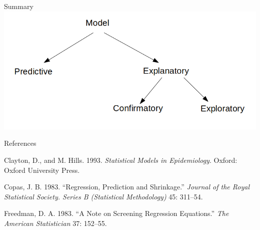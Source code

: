 \documentclass[
  10pt,
  ignorenonframetext,
]{beamer}
\newlength{\cslhangindent}
\newlength{\cslentryspacingunit} %
\newenvironment{CSLReferences}[2] %
 {%
  \setlength{\parindent}{0pt}
  \ifodd #1
  \let\oldpar\par
  \def\par{\hangindent=\cslhangindent\oldpar}
  \fi
  \setlength{\parskip}{#2\cslentryspacingunit}
 }%
 {}
\begin{document}
\begin{frame}
\begin{block}{Summary}
\protect\hypertarget{summary}{}
\includegraphics{graphics/models.png}
\end{block}
\end{frame}

\begin{frame}{References}
\protect\hypertarget{references}{}
\scriptsize

\hypertarget{refs}{}
\begin{CSLReferences}{1}{0}
\leavevmode{}%
Clayton, D., and M. Hills. 1993. \emph{Statistical Models in
Epidemiology}. Oxford: Oxford University Press.

\leavevmode{}%
Copas, J. B. 1983. {``Regression, Prediction and Shrinkage.''}
\emph{Journal of the Royal Statistical Society. Series B (Statistical
Methodology)} 45: 311--54.

\leavevmode{}%
Freedman, D. A. 1983. {``A Note on Screening Regression Equations.''}
\emph{The American Statistician} 37: 152--55.

\end{CSLReferences}
\end{frame}
\end{document}
